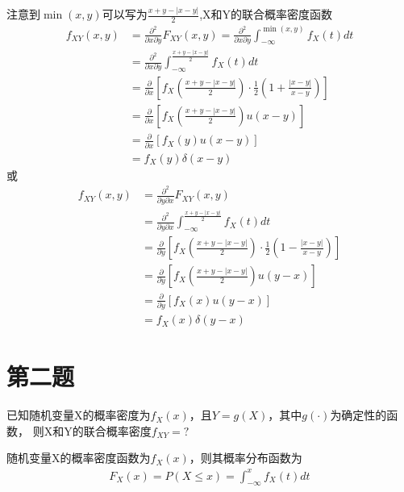 \documentclass[fontset=windows]{article}
\numberwithin{figure}{section}
\begin{document}
注意到\(\min(x,y)\)可以写为\(\frac{x+y-|x-y|}{2}\),X和Y的联合概率密度函数
\begin{align*}
    f_{XY}(x,y)
     & =\frac{\partial^2}{\partial x \partial y}F_{XY}(x,y)=\frac{\partial^2}{\partial x \partial y} \int_{-\infty}^{\min(x,y)} f_{X}(t)dt \\
     & =\frac{\partial^2}{\partial x \partial y} \int_{-\infty}^{\frac{x+y-|x-y|}{2}} f_{X}(t)dt                                           \\
     & =\frac{\partial}{\partial x}\left[f_X(\frac{x+y-|x-y|}{2})\cdot\frac{1}{2}(1+\frac{|x-y|}{x-y}) \right]                             \\
     & =\frac{\partial}{\partial x}\left[f_X(\frac{x+y-|x-y|}{2})u(x-y) \right]                                                            \\
     & =\frac{\partial}{\partial x}\left[f_X(y)u(x-y) \right]                                                                              \\
     & =f_X(y)\delta(x-y)
\end{align*}
或
\begin{align*}
    f_{XY}(x,y)
     & =\frac{\partial^2}{\partial y \partial x}F_{XY}(x,y)                                                    \\
     & =\frac{\partial^2}{\partial y \partial x} \int_{-\infty}^{\frac{x+y-|x-y|}{2}} f_{X}(t)dt               \\
     & =\frac{\partial}{\partial y}\left[f_X(\frac{x+y-|x-y|}{2})\cdot\frac{1}{2}(1-\frac{|x-y|}{x-y}) \right] \\
     & =\frac{\partial}{\partial y}\left[f_X(\frac{x+y-|x-y|}{2})u(y-x) \right]                                \\
     & =\frac{\partial}{\partial y}\left[f_X(x)u(y-x) \right]                                                  \\
     & =f_X(x)\delta(y-x)
\end{align*}

\section{第二题}
已知随机变量X的概率密度为\(f_X(x)\)，且\(Y=g(X)\)，其中\(g(\cdot)\)为确定性的函数，
则X和Y的联合概率密度\(f_{XY}=?\)

随机变量X的概率密度函数为\(f_X(x)\)，则其概率分布函数为
\begin{align*}
    F_X(x)=P(X\leq x)=\int_{-\infty}^{x} f_X(t)dt
\end{align*}
\end{document}

